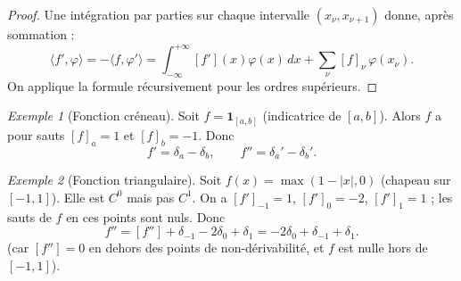 \documentclass[12pt,a4paper,openany]{book}
\theoremstyle{definition}
\theoremstyle{plain}
\theoremstyle{remark}
\newtheorem*{example}{Exemple}
\newenvironment{exemple}{\begin{example}}{\end{example}}
\begin{document}
	\begin{proof}
		Une intégration par parties sur chaque intervalle $(x_\nu, x_{\nu+1})$ donne, après sommation :
		\[
		\langle f', \varphi\rangle = -\langle f, \varphi'\rangle = \int_{-\infty}^{+\infty}[f'](x)\varphi(x)\,dx + \sum_\nu [f]_\nu\,\varphi(x_\nu).
		\]
		On applique la formule récursivement pour les ordres supérieurs.
	\end{proof}
	
	\begin{exemple}[Fonction créneau]
		Soit $f = \mathbf{1}_{[a,b]}$ (indicatrice de $[a,b]$). Alors $f$ a pour sauts $[f]_a = 1$ et $[f]_b = -1$. Donc
		\[
		f' = \delta_a - \delta_b, \qquad f'' = \delta_a' - \delta_b'.
		\]
	\end{exemple}
	
	\begin{exemple}[Fonction triangulaire]
		Soit $f(x) = \max(1 - |x|, 0)$ (chapeau sur $[-1,1]$). Elle est $C^0$ mais pas $C^1$. On a $[f']_{-1} = 1$, $[f']_0 = -2$, $[f']_1 = 1$ ; les sauts de $f$ en ces points sont nuls. Donc
		\[
		f'' = [f''] + \delta_{-1} - 2\delta_0 + \delta_1 = -2\delta_0 + \delta_{-1} + \delta_1.
		\]
		(car $[f''] = 0$ en dehors des points de non-dérivabilité, et $f$ est nulle hors de $[-1,1]$).
	\end{exemple}
	
\end{document}
